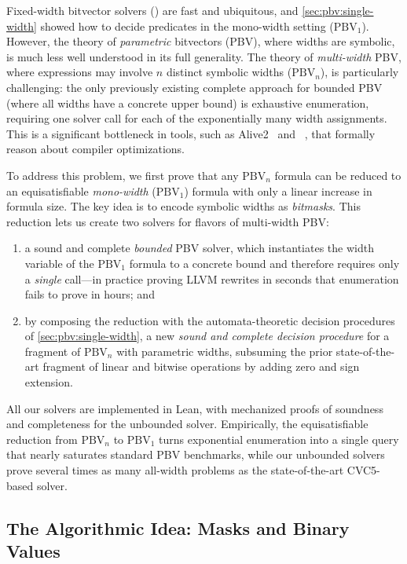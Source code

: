 Fixed-width bitvector solvers (\qfbv{}) are fast and ubiquitous,
and \cref{sec:pbv:single-width} showed how to decide predicates in the
mono-width setting ($\text{PBV}_1$). However, the theory of \emph{parametric} bitvectors
(PBV), where widths are symbolic, is much less well understood in its full
generality. The theory of \emph{multi-width} PBV, where expressions may
involve $n$ distinct symbolic widths ($\text{PBV}_n$), is particularly
challenging: the only previously existing complete approach for bounded PBV
(where all widths have a concrete upper bound) is exhaustive enumeration,
requiring one \qfbv{} solver call for each of the exponentially many width
assignments. This is a significant bottleneck in tools, such as
Alive2~\citep{lopes2021alive2} and \hydra{}~\citep{mukherjee2024hydra}, that
formally reason about compiler optimizations.

To address this problem, we first prove that any $\text{PBV}_n$ formula can be
reduced to an equisatisfiable \emph{mono-width} ($\text{PBV}_1$) formula with
only a linear increase in formula size. The key idea is to encode symbolic
widths as \emph{bitmasks}. This reduction lets us create two solvers for
flavors of multi-width PBV:
\begin{enumerate}
  \item a sound and complete \emph{bounded} PBV solver, which instantiates
  the width variable of the $\text{PBV}_1$ formula to a concrete bound and
  therefore requires only a \emph{single} \qfbv{} call---in practice proving
  LLVM rewrites in seconds that enumeration fails to prove in hours; and
  \item by composing the reduction with the automata-theoretic decision
  procedures of \cref{sec:pbv:single-width}, a new \emph{sound and complete
  decision procedure} for a fragment of $\text{PBV}_n$ with parametric
  widths, subsuming the prior state-of-the-art fragment of linear and bitwise
  operations by adding zero and sign extension.
\end{enumerate}
All our solvers are implemented in Lean, with mechanized proofs of soundness
and completeness for the unbounded solver. Empirically, the equisatisfiable
reduction from $\text{PBV}_n$ to $\text{PBV}_1$ turns exponential enumeration
into a single \qfbv{} query that nearly saturates standard PBV benchmarks,
while our unbounded solvers prove several times as many all-width problems as
the state-of-the-art CVC5-based solver.

\subsection{The Algorithmic Idea: Masks and Binary Values}
\label{sec:mwbv:idea}

